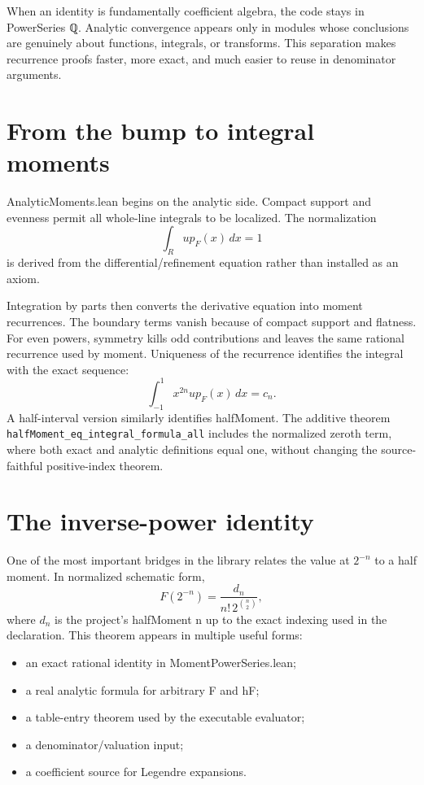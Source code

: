 \documentclass[11pt,a4paper,openany]{book}
\def\module#1{#1.lean}
\def\decl#1{#1}
\def\code#1{#1}
\def\upfun{up}
\def\R{R}
\newcommand{\R}{\ensuremath{\mathbb{R}}}
\newcommand{\upfun}{\ensuremath{\operatorname{up}}}
\newcommand{\module}[1]{\nolinkurl{#1.lean}}
\newcommand{\decl}[1]{\texttt{\detokenize{#1}}}
\newcommand{\code}[1]{\texttt{\detokenize{#1}}}
\newcommand{\pathbreak}[1]{\nolinkurl{#1}}
\begin{document}
\begin{engineering}
When an identity is fundamentally coefficient algebra, the code stays in
\code{PowerSeries ℚ}.  Analytic convergence appears only in modules whose
conclusions are genuinely about functions, integrals, or transforms.  This
separation makes recurrence proofs faster, more exact, and much easier to
reuse in denominator arguments.
\end{engineering}

\section{From the bump to integral moments}
\module{AnalyticMoments} begins on the analytic side.  Compact support and
evenness permit all whole-line integrals to be localized.  The normalization
\[
 \int_{\R}\upfun_F(x)\,dx=1
\]
is derived from the differential/refinement equation rather than installed as
an axiom.

Integration by parts then converts the derivative equation into moment
recurrences.  The boundary terms vanish because of compact support and
flatness.  For even powers, symmetry kills odd contributions and leaves the
same rational recurrence used by \decl{moment}.  Uniqueness of the recurrence
identifies the integral with the exact sequence:
\[
 \int_{-1}^{1} x^{2n}\upfun_F(x)\,dx=c_n.
\]
A half-interval version similarly identifies \decl{halfMoment}.  The additive
theorem \pathbreak{halfMoment_eq_integral_formula_all} includes the normalized
zeroth term, where both exact and analytic definitions equal one, without
changing the source-faithful positive-index theorem.

\section{The inverse-power identity}
One of the most important bridges in the library relates the value at
$2^{-n}$ to a half moment.  In normalized schematic form,
\[
 F(2^{-n})=
 \frac{d_n}{n!\,2^{\binom n2}},
\]
where $d_n$ is the project's \decl{halfMoment n} up to the exact indexing used
in the declaration.  This theorem appears in multiple useful forms:
\begin{itemize}
  \item an exact rational identity in \module{MomentPowerSeries};
  \item a real analytic formula for arbitrary \code{F} and \code{hF};
  \item a table-entry theorem used by the executable evaluator;
  \item a denominator/valuation input;
  \item a coefficient source for Legendre expansions.
\end{itemize}
\end{document}
